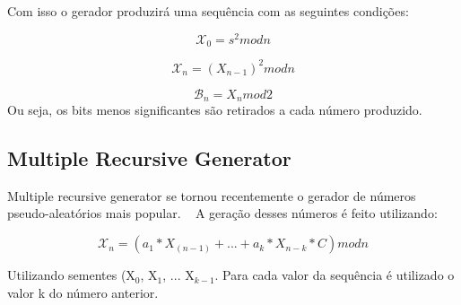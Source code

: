 Com isso o gerador produzirá uma sequência com as seguintes condições:

\begin{equation}
	\label{Equação para produzir a sequência}
	\mathcal{X}_0 = s^2 mod n
\end{equation}

\begin{equation}
	\label{Equação para produzir a sequência}
	\mathcal{X}_n = (X_{n-1})^2 mod n
\end{equation}

\begin{equation}
	\label{Equação para produzir a sequência}
	\mathcal{B}_n = X_n mod 2
\end{equation}
Ou seja, os bits menos significantes são retirados a cada número produzido.

\subsection{Multiple Recursive Generator}
\label{multiple-recursive-generator}
Multiple recursive generator se tornou recentemente o gerador de números pseudo-aleatórios mais popular. ~\cite{lih-yuan} A geração desses números é feito utilizando:

\begin{equation}
	\label{Função para produção dos números}
	\mathcal{X}_n = (a_1*X_(n-1) + ... + a_k * X_{n-k} * C) mod n
\end{equation}

Utilizando sementes (X$_0$, X$_1$, ... X$_{k-1}$. Para cada valor da sequência é utilizado o valor k do número anterior. 
